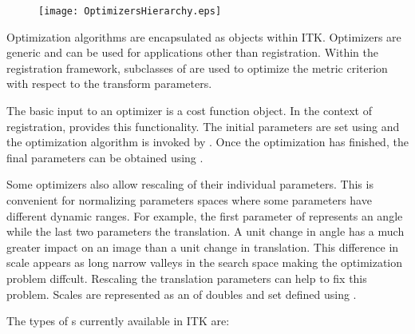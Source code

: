 


\begin{figure}
\center
\texttt{[image: OptimizersHierarchy.eps]}
\label{fig:OptimizersHierarchy}
\end{figure}

Optimization algorithms are encapsulated as  objects
within ITK. Optimizers are generic and can be used for applications other than
registration.  Within the registration framework, subclasses of
 are used to optimize the metric
criterion with respect to the transform parameters.


The basic input to an optimizer is a cost function object. In the context
of registration,  provides this functionality.
The initial parameters are set using  and
the optimization algorithm is invoked by .
Once the optimization has finished, the final parameters can be obtained
using .

Some optimizers also allow rescaling of their individual parameters. This
is convenient for normalizing parameters spaces where some parameters
have different dynamic ranges. For example, the first parameter of
 represents an angle while the last two parameters
the translation. A unit change in angle has a much greater impact on
an image than a unit change in translation. This difference in scale appears
as long narrow valleys in the search space making the optimization problem
diffcult. Rescaling the translation parameters can help to fix this problem.
Scales are represented as an  of doubles and set defined using
.

The types of s currently available
in ITK are:



